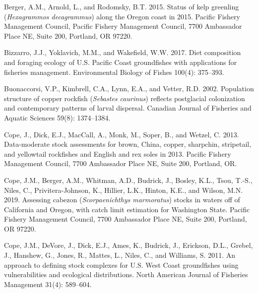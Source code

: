 \documentclass[11pt,
  english,
  a4paper,
]{article}
\newlength{\cslhangindent}
\newenvironment{CSLReferences}[2] %
 {%
  \setlength{\parindent}{0pt}
  \ifodd #1 \everypar{\setlength{\hangindent}{\cslhangindent}}\ignorespaces\fi
  \ifnum #2 > 0
  \setlength{\parskip}{#2\baselineskip}
  \fi
 }%
 {}
\begin{document}
\hypertarget{refs}{}
\begin{CSLReferences}{1}{0}
\leavevmode{}%
Berger, A.M., Arnold, L., and Rodomsky, B.T. 2015. Status of kelp greenling (\emph{{Hexagrammos} decagrammus}) along the {Oregon} coast in 2015. Pacific Fishery Management Council, Pacific Fishery Management Council, 7700 Ambassador Place NE, Suite 200, Portland, OR 97220.

\leavevmode{}%
Bizzarro, J.J., Yoklavich, M.M., and Wakefield, W.W. 2017. Diet composition and foraging ecology of {U}.{S}. {Pacific} {Coast} groundfishes with applications for fisheries management. Environmental Biology of Fishes 100(4): 375--393.

\leavevmode{}%
Buonaccorsi, V.P., Kimbrell, C.A., Lynn, E.A., and Vetter, R.D. 2002. Population structure of copper rockfish (\emph{{Sebastes} caurinus}) reflects postglacial colonization and contemporary patterns of larval dispersal. Canadian Journal of Fisheries and Aquatic Sciences 59(8): 1374--1384.

\leavevmode{}%
Cope, J., Dick, E.J., MacCall, A., Monk, M., Soper, B., and Wetzel, C. 2013. Data-moderate stock assessments for brown, {China}, copper, sharpchin, stripetail, and yellowtail rockfishes and {English} and rex soles in 2013. Pacific Fishery Management Council, 7700 Ambassador Place NE, Suite 200, Portland, OR.

\leavevmode{}%
Cope, J.M., Berger, A.M., Whitman, A.D., Budrick, J., Bosley, K.L., Tsou, T.-S., Niles, C., Privitera-Johnson, K., Hillier, L.K., Hinton, K.E., and Wilson, M.N. 2019. Assessing cabezon (\emph{{Scorpaenichthys} marmoratus}) stocks in waters off of {California} and {Oregon}, with catch limit estimation for {Washington} {State}. Pacific Fishery Management Council, 7700 Ambassador Place NE, Suite 200, Portland, OR 97220.

\leavevmode{}%
Cope, J.M., DeVore, J., Dick, E.J., Ames, K., Budrick, J., Erickson, D.L., Grebel, J., Hanshew, G., Jones, R., Mattes, L., Niles, C., and Williams, S. 2011. An approach to defining stock complexes for {U}.{S}. {West} {Coast} groundfishes using vulnerabilities and ecological distributions. North American Journal of Fisheries Management 31(4): 589--604.


\end{CSLReferences}
\end{document}
